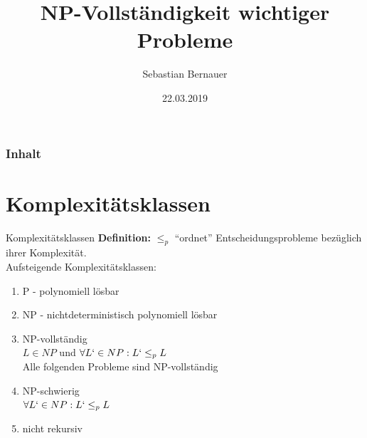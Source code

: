 \documentclass[12pt,donthandout,notes=dontshow,xcolor=table]{beamer}
\author{Sebastian Bernauer}
\title{NP-Vollständigkeit wichtiger Probleme}
\date{22.03.2019}
\begin{document}
\begin{frame}
\titlepage
\end{frame}

\begin{frame}[allowframebreaks]
\frametitle{Inhalt}
\tableofcontents
\end{frame}

%

\section{Komplexitätsklassen}
\begin{frame}{Komplexitätsklassen}
\textbf{Definition:} \(\leq_p\) ``ordnet'' Entscheidungsprobleme bezüglich ihrer Komplexität.\\
Aufsteigende Komplexitätsklassen:
\begin{enumerate}
\item P - polynomiell lösbar
\pause
\item NP - nichtdeterministisch polynomiell lösbar
\pause
\item NP-vollständig\\
\textrightarrow \(L \in NP\) und \(\forall L` \in NP: L` \leq_p L\)\\
\pause
\textrightarrow Alle folgenden Probleme sind NP-vollständig
\pause
\item NP-schwierig\\
\textrightarrow \(\forall L` \in NP: L` \leq_p L\)
\pause
\item nicht rekursiv
\end{enumerate}
\end{frame}
\end{document}
